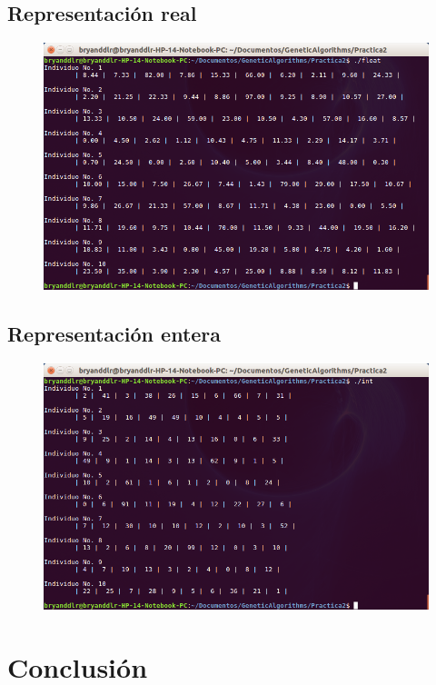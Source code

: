 \documentclass[11pt,letterpaper]{article}
\begin{document}
\subsection*{Representación real}
\begin{figure}[H]
	\centering
	\includegraphics[scale = 0.5]{images/ej3}
\end{figure}

\subsection*{Representación entera}
\begin{figure}[H]
	\centering
	\includegraphics[scale = 0.5]{images/ej4}
\end{figure}

\section*{Conclusión}
\end{document}
